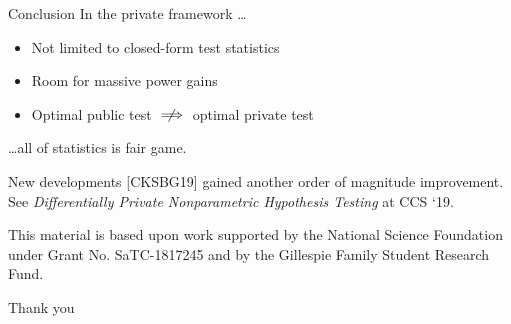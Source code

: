 \documentclass{beamer}
\begin{document}
\begin{frame}{Conclusion}
\large In the private framework \ldots \par
 \normalsize
\begin{itemize}
	\item Not limited to closed-form test statistics
	\item Room for massive power gains 
	\item Optimal public test $\centernot \implies$ optimal private test
\end{itemize}

\large \ldots all of statistics is fair game.
 \normalsize
 
 \begin{block}{New developments}
[CKSBG19] gained another order of magnitude improvement. See \textit{Differentially Private Nonparametric Hypothesis Testing} at CCS `19.
 \end{block}

This material is based upon work supported by the National Science Foundation under Grant No. SaTC-1817245 and by the Gillespie Family Student Research Fund.
\end{frame}



\begin{frame}{}
    \begin{center}
        \Huge Thank you
    \end{center}    
\end{frame}
\end{document}
